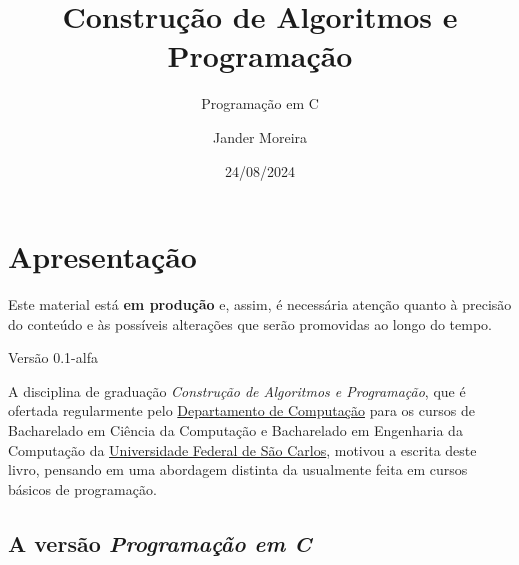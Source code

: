 \documentclass[
  11pt,
  a4paper,
]{scrbook}
\title{Construção de Algoritmos e Programação}
\subtitle{Programação em C}
\author{Jander Moreira}
\date{24/08/2024}
\begin{document}
\frontmatter
\maketitle






\mainmatter
{}

\chapter*{Apresentação}\label{apresentauxe7uxe3o}


\begin{tcolorbox}[enhanced jigsaw, arc=.35mm, bottomtitle=1mm, colbacktitle=quarto-callout-important-color!10!white, title=\textcolor{quarto-callout-important-color}{\faExclamation}\hspace{0.5em}{Importante}, toprule=.15mm, left=2mm, opacityback=0, colback=white, colframe=quarto-callout-important-color-frame, opacitybacktitle=0.6, bottomrule=.15mm, leftrule=.75mm, toptitle=1mm, coltitle=black, titlerule=0mm, rightrule=.15mm, breakable]

Este material está \textbf{em produção} e, assim, é necessária atenção
quanto à precisão do conteúdo e às possíveis alterações que serão
promovidas ao longo do tempo.

Versão 0.1-alfa

\end{tcolorbox}

A disciplina de graduação \emph{Construção de Algoritmos e Programação},
que é ofertada regularmente pelo
\href{https://www.dc.ufscar.br}{Departamento de Computação} para os
cursos de Bacharelado em Ciência da Computação e Bacharelado em
Engenharia da Computação da \href{https://www.ufscar.br}{Universidade
Federal de São Carlos}, motivou a escrita deste livro, pensando em uma
abordagem distinta da usualmente feita em cursos básicos de programação.

\section*{\texorpdfstring{A versão \emph{Programação em
C}}{A versão Programação em C}}\label{a-versuxe3o}
\end{document}
